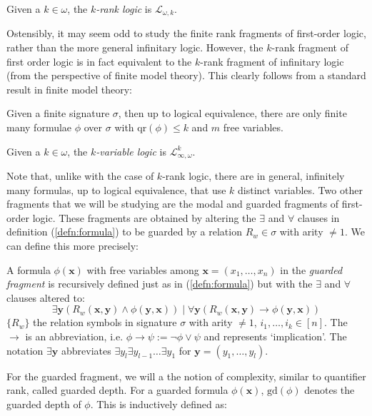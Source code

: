 \begin{defn}
Given a $k \in \omega$, the \textit{$k$-rank logic} is $\mathcal{L}_{\omega,k}$. 
\end{defn}
Ostensibly, it may seem odd to study the finite rank fragments of first-order logic, rather than the more general infinitary logic. However, the $k$-rank fragment of first order logic is in fact equivalent to the $k$-rank fragment of infinitary logic (from the perspective of finite model theory). This clearly follows from a standard result in finite model theory:
\begin{prop}
Given a finite signature $\sigma$, then up to logical equivalence, there are only finite many formulae $\phi$ over $\sigma$ with $\text{qr}(\phi)\leq k$ and $m$ free variables.
\end{prop}
\begin{defn}
Given a $k \in \omega$, the \textit{$k$-variable logic} is $\mathcal{L}^{k}_{\infty,\omega}$.
\end{defn}
Note that, unlike with the case of $k$-rank logic, there are in general, infinitely many formulas, up to logical equivalence, that use $k$ distinct variables. Two other fragments that we will be studying are the modal and guarded fragments of first-order logic. These fragments are obtained by altering the $\exists$ and $\forall$ clauses in definition (\ref{defn:formula}) to be guarded by a relation $R_{w} \in \sigma$ with arity $\not= 1$. We can define this more precisely: 
\begin{defn}
A formula $\phi(\mathbf{x})$ with free variables among $\mathbf{x} = (x_{1},\dots,x_{n})$ in the \textit{guarded fragment} is recursively defined just as in (\ref{defn:formula}) but with the $\exists$ and $\forall$ clauses altered to:  
$$ \exists \mathbf{y} (R_{w}(\mathbf{x},\mathbf{y}) \wedge \phi(\mathbf{y},\mathbf{x})) \mid \forall \mathbf{y}(R_{w}(\mathbf{x},\mathbf{y}) \rightarrow \phi(\mathbf{y},\mathbf{x}))$$
$\{R_{w}\}$ the relation symbols in signature $\sigma$ with arity $\not= 1$, $i_{1},\dots,i_{k} \in [n]$. The $\rightarrow$ is an abbreviation, i.e. $\phi \rightarrow \psi := \neg \phi \vee \psi$ and represents `implication'. The notation $\exists \mathbf{y}$ abbreviates $\exists y_{l} \exists y_{l-1} \dots \exists y_{1}$ for $\mathbf{y} = (y_{1},\dots,y_{l})$.
\label{defn:guardedLogic}
\end{defn}
For the guarded fragment, we will a the notion of complexity, similar to quantifier rank, called guarded depth. For a guarded formula $\phi(\mathbf{x})$, $\text{gd}(\phi)$ denotes the guarded depth of $\phi$. This is inductively defined as:   

